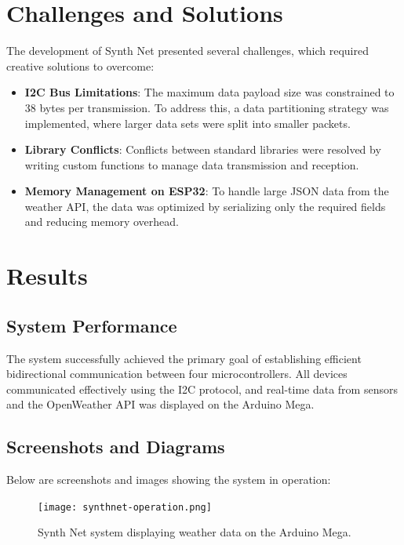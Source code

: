 \documentclass[a4paper,12pt]{report}
\begin{document}
    \newpage
    
    \chapter{Challenges and Solutions}
    The development of Synth Net presented several challenges, which required creative solutions to overcome:
    
    \begin{itemize}
        \item \textbf{I2C Bus Limitations}: The maximum data payload size was constrained to 38 bytes per transmission. To address this, a data partitioning strategy was implemented, where larger data sets were split into smaller packets.
        \item \textbf{Library Conflicts}: Conflicts between standard libraries were resolved by writing custom functions to manage data transmission and reception. 
        \item \textbf{Memory Management on ESP32}: To handle large JSON data from the weather API, the data was optimized by serializing only the required fields and reducing memory overhead.
    \end{itemize}
    
    \newpage
    
    \chapter{Results}
    
    \section{System Performance}
    The system successfully achieved the primary goal of establishing efficient bidirectional communication between four microcontrollers. All devices communicated effectively using the I2C protocol, and real-time data from sensors and the OpenWeather API was displayed on the Arduino Mega.
    
    \section{Screenshots and Diagrams}
    Below are screenshots and images showing the system in operation:
    
    \begin{figure}[h]
    \centering
    \texttt{[image: synthnet-operation.png]}
    \caption{Synth Net system displaying weather data on the Arduino Mega.}
    \end{figure}
    
\end{document}
